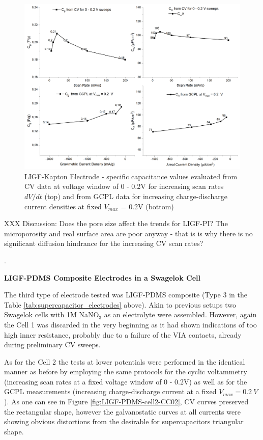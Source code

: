 \begin{figure}[H]
\centering
\includegraphics[width=1\textwidth]{Figures/Results/Electrochemistry/LIGF-PI-NaNO3-Swagelok/Cell2/Capacitances-4.jpg}
\medskip
\captionsetup{width=0.7\linewidth}
\caption{LIGF-Kapton Electrode - specific capacitance values evaluated from CV data at voltage window of 0 - 0.2\:V for increasing scan rates $dV/dt$ (top) and from GCPL data for increasing charge-discharge current densities at fixed $V_{max}$ = 0.2\:V (bottom)}
\label{fig:LIGF-PI-capcitance-4}
\end{figure}

XXX Discussion: Does the pore size affect the trends for LIGF-PI? The microporosity and real surface area are poor anyway - that is is why there is no significant diffusion hindrance for the increasing CV scan rates?

.

\textbf{LIGF-PDMS Composite Electrodes in a Swagelok Cell}

The third type of electrode tested was LIGF-PDMS composite (Type 3 in the Table \ref{tab:supercapacitor_electrodes} above). Akin to previous setups two Swagelok cells with 1M NaNO$_3$ as an electrolyte were assembled. However, again the Cell 1 was discarded in the very beginning as it had shown indications of too high inner resistance, probably due to a failure of the VIA contacts,  already during preliminary CV sweeps. 

As for the Cell 2 the tests at lower potentials were performed in the identical manner as before by employing the same protocols for the cyclic voltammetry (increasing scan rates at a fixed voltage window of 0 - 0.2\:V) as well as for the GCPL measurements (increasing charge-discharge current at a fixed $V_{max}=0.2\:V$). As one can see in Figure \ref{fig:LIGF-PDMS-cell2-CC02}, CV curves preserved the rectangular shape, however the galvanostatic curves at all currents were showing obvious distortions from the desirable for supercapacitors triangular shape.  

